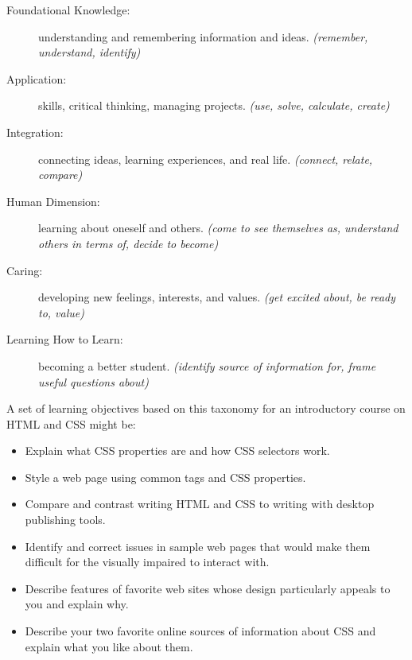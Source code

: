 \begin{description}

\item[Foundational Knowledge:]
  understanding and remembering information and ideas.
  \emph{(remember, understand, identify)}

\item[Application:]
  skills, critical thinking, managing projects.
  \emph{(use, solve, calculate, create)}

\item[Integration:]
  connecting ideas, learning experiences, and real life.
  \emph{(connect, relate, compare)}

\item[Human Dimension:]
  learning about oneself and others.
  \emph{(come to see themselves as, understand others in terms of, decide to become)}

\item[Caring:]
  developing new feelings, interests, and values.
  \emph{(get excited about, be ready to, value)}

\item[Learning How to Learn:]
  becoming a better student.
  \emph{(identify source of information for, frame useful questions about)}

\end{description}

A set of learning objectives based on this taxonomy
for an introductory course on HTML and CSS might be:

\begin{itemize}

\item
  Explain what CSS properties are and how CSS selectors work.

\item
  Style a web page using common tags and CSS properties.

\item
  Compare and contrast writing HTML and CSS
  to writing with desktop publishing tools.

\item
  Identify and correct issues in sample web pages
  that would make them difficult for the visually impaired to interact with.

\item
  Describe features of favorite web sites
  whose design particularly appeals to you
  and explain why.

\item
  Describe your two favorite online sources of information about CSS
  and explain what you like about them.

\end{itemize}

